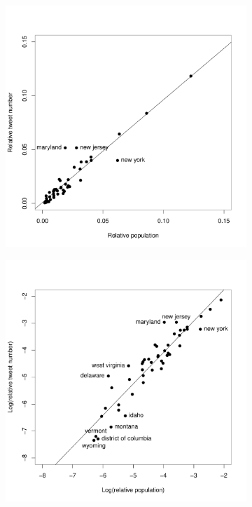 \documentclass[11pt, a4paper,twoside]{report}\usepackage[]{graphicx}\usepackage[]{color}
\begin{document}
\begin{figure}[htbp!]
\centering
 \begin{subfigure}[t]{0.6\textwidth}
  \includegraphics[width=1\linewidth]{16_ScatterTweetPop.pdf}
  \caption{}
  \label{fig:tweets_state_full_scatter}
  \end{subfigure}
  
  \begin{subfigure}[t]{0.6\textwidth}
  \includegraphics[width=1\linewidth]{17_ScatterTweetPop_log.pdf}
  \caption{}
  \label{fig:tweets_state_full_scatter_log}
  \end{subfigure}


\end{figure}
\end{document}
